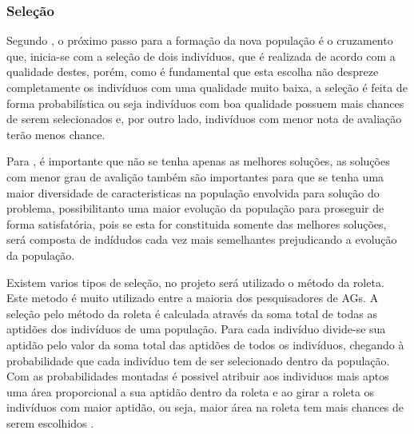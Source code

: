 

\subsubsection{Seleção}

\par Segundo , o próximo passo
para a formação da nova população é o cruzamento que, inicia-se com a seleção de
dois indivíduos, que é realizada de acordo com a qualidade destes, porém,
como é fundamental que esta escolha não despreze completamente os indivíduos com uma
qualidade muito baixa, a seleção é feita de forma probabilística ou seja
indivíduos com boa qualidade possuem mais chances de serem selecionados e, por outro lado,
indivíduos com menor nota de avaliação terão menos chance.

\par Para , é importante que não se tenha
apenas as melhores soluções, as soluções com menor grau de avalição também são
importantes para que se tenha uma maior diversidade de caracteristicas na
população envolvida para solução do problema, possibilitanto uma maior evolução
da população para proseguir de forma satisfatória, pois se esta for
constituida somente das melhores soluções, será composta de indídudos
cada vez mais semelhantes prejudicando a evolução da população. 

\par Existem varios tipos de seleção, no projeto será utilizado o método da
roleta. Este metodo é muito utilizado entre a maioria dos pesquisadores de AGs.
A seleção pelo método da roleta é calculada através
da soma total de todas as aptidões dos indivíduos de uma população. Para
cada indivíduo divide-se sua aptidão pelo valor da soma total das aptidões
de todos os indivíduos, chegando à probabilidade que cada indivíduo tem
de ser selecionado dentro da população. Com as probabilidades montadas é
possivel atribuir aos individuos mais aptos uma área proporcional a sua aptidão
dentro da roleta e ao girar a roleta os indivíduos com maior aptidão, ou seja,
maior área na roleta tem mais chances de serem escolhidos \cite{livro_ags_ricardo_linden}.

